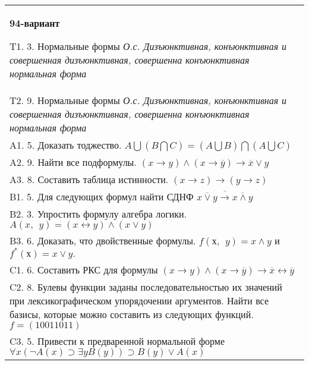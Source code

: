 \documentclass{article}
\begin{document}
\begin{tabular}{m{17cm}}
\textbf{94-вариант}
\newline

T1. 3. Нормальные формы \emph{О.с. Дизъюнктивная, конъюнктивная и совершенная дизъюнктивная, совершенна конъюнктивная нормальная форма} \\
T2. 9. Нормальные формы \emph{О.с. Дизъюнктивная, конъюнктивная и совершенная дизъюнктивная, совершенна конъюнктивная нормальная форма} \\
A1. 5. Доказать тоджество. \(A\bigcup(B\bigcap C) = (A\bigcup B)\bigcap(A\bigcup C)\) \\
A2. 9. Найти все подформулы. \((x \rightarrow y) \land (x \rightarrow \overline{y}) \rightarrow \overline{x} \vee y\) \\
A3. 8. Составить таблица истинности. \((x \rightarrow z) \rightarrow (y \rightarrow z)\) \\
B1. 5. Для следующих формул найти СДНФ \(\overline{\overline{x \vee y} \rightarrow \overline{x \land y}}\) \\
B2. 3. Упростить формулу алгебра логики. \(A(x,\ \ y) = (x \leftrightarrow y) \land (x \vee y)\) \\
B3. 6. Доказать, что двойственные формулы. \(f(х,\ \ y) = x \land y\) и \(f^{*}(х) = x \vee y.\) \\
C1. 6. Составить РКС для формулы \((x \rightarrow y) \land (x \rightarrow \overline{y}) \rightarrow \overline{x} \leftrightarrow \overline{y}\) \\
C2. 8. Булевы функции заданы последовательностью их значений при лексикографическом упорядочении аргументов. Найти все базисы, которые можно составить из следующих функций. \(f = (10011011)\) \\
C3. 5. Привести к предваренной нормальной форме \(\forall x(\neg A(x) \supset \exists yB(y)) \supset B(y) \vee A(x)\) \\

\end{tabular}
\vspace{1cm}
\end{document}

